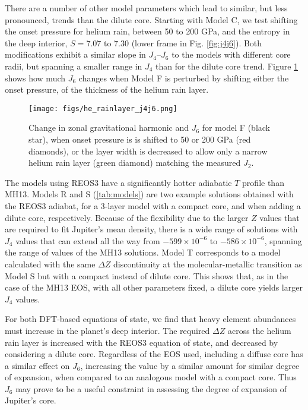 There are a number of other model parameters which lead to similar, but less
pronounced, trends than the dilute core. Starting with Model C, we test
shifting the onset pressure for helium rain, between 50 to 200 GPa, and the
entropy in the deep interior, $S=7.07$ to $7.30$ (lower frame in Fig.
\ref{fig:j4j6}).  Both modifications exhibit a similar slope in $J_4$--$J_6$ to
the models with different core radii, but spanning a smaller range in $J_4$
than for the dilute core trend. Figure \ref{fig:j4j6_rain} shows how much $J_6$
changes when Model F is perturbed by shifting either the onset pressure, of the
thickness of the helium rain layer.

\begin{figure}[h]
\centering

\texttt{[image: figs/he\_rainlayer\_j4j6.png]}

\caption{ Change in zonal gravitational harmonic and $J_6$ for model F (black star),
    when onset pressure is is shifted to 50 or 200 GPa (red diamonds), or the layer
width is decreased to allow only a narrow helium rain layer (green diamond)
    matching the measured $J_2$.}
\label{fig:j4j6_rain}
\end{figure}

The models using REOS3 have a significantly hotter adiabatic $T$ profile than
MH13.  Models R and S (\ref{tab:models}) are two example solutions obtained
with the REOS3 adiabat, for a 3-layer model with a compact core, and when
adding a dilute core, respectively.  Because of the flexibility due to the
larger $Z$ values that are required to fit Jupiter's mean density, there is a
wide range of solutions \citep{Nettelmann2012, miguel2016} with $J_4$ values
that can extend all the way from $-599\times 10^{-6}$ to $-586\times 10^{-6}$, spanning the
range of values of the MH13 solutions. Model T corresponds to a model calculated 
with the same $\Delta Z$ discontinuity at the molecular-metallic transition as Model S 
but with a compact instead of dilute core. This shows that, as in the case of the MH13 EOS, 
with all other parameters fixed, a dilute core yields larger $J_4$ values.  

For both DFT-based equations of state, we find that heavy element abundances
must increase in the planet's deep interior. The required $\Delta Z$ across the
helium rain layer is increased with the REOS3 equation of state, and
decreased by considering a dilute core.  Regardless of the EOS used, including
a diffuse core has a similar effect on $J_6$, increasing the value by a
similar amount for similar degree of expansion, when compared to an analogous
model with a compact core. Thus $J_6$ may prove to be a useful constraint in
assessing the degree of expansion of Jupiter's core. 

